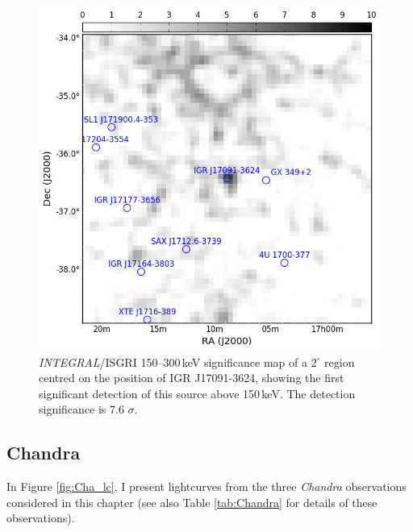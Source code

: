 \begin{figure}
    \includegraphics[width=0.7\columnwidth, trim = 0.6cm 0 3.9cm 0]{images/sigmap.png}
    \captionsetup{singlelinecheck=off}
    \caption[\textit{INTEGRAL}/ISGRI 150--300\,keV significance map of a $2^\circ$ region centred on the position of IGR J17091-3624.]{\indexibis\textit{INTEGRAL}/ISGRI 150--300\,keV significance map of a $2^\circ$ region centred on the position of IGR J17091-3624, showing the first significant detection of this source above 150\,keV.  The detection significance is 7.6 $\sigma$.}
   \label{fig:sigmap}
\end{figure}

\subsection{Chandra}

\par In Figure \ref{fig:Cha_lc}, I present lightcurves from the three \indexchandra\textit{Chandra} observations considered in this chapter (see also Table \ref{tab:Chandra} for details of these observations).

